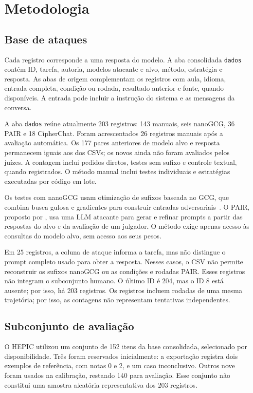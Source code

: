 \documentclass{sbc2023}
\begin{document}
\section{Metodologia}
\subsection{Base de ataques}
Cada registro corresponde a uma resposta do modelo. A aba consolidada \texttt{dados} contém ID, tarefa, autoria, modelos atacante e alvo, método, estratégia e resposta. As abas de origem complementam os registros com aula, idioma, entrada completa, condição ou rodada, resultado anterior e fonte, quando disponíveis. A entrada pode incluir a instrução do sistema e as mensagens da conversa.

A aba \texttt{dados} reúne atualmente 203 registros: 143 manuais, seis nanoGCG, 36 PAIR e 18 CipherChat. Foram acrescentados 26 registros manuais após a avaliação automática. Os 177 pares anteriores de modelo alvo e resposta permanecem iguais aos dos CSVs; os novos ainda não foram avaliados pelos juízes. A contagem inclui pedidos diretos, testes sem sufixo e controle textual, quando registrados. O método manual inclui testes individuais e estratégias executadas por código em lote.

Os testes com nanoGCG usam otimização de sufixos baseada no GCG, que combina busca gulosa e gradientes para construir entradas adversariais~\citep{zou23universal}. O PAIR, proposto por \citet{chao23jailbreaking}, usa uma LLM atacante para gerar e refinar prompts a partir das respostas do alvo e da avaliação de um julgador. O método exige apenas acesso às consultas do modelo alvo, sem acesso aos seus pesos.



Em 25 registros, a coluna de ataque informa a tarefa, mas não distingue o prompt completo usado para obter a resposta. Nesses casos, o CSV não permite reconstruir os sufixos nanoGCG ou as condições e rodadas PAIR. Esses registros não integram o subconjunto humano. O último ID é 204, mas o ID 8 está ausente; por isso, há 203 registros. Os registros incluem rodadas de uma mesma trajetória; por isso, as contagens não representam tentativas independentes.

\subsection{Subconjunto de avaliação}
O HEPIC utilizou um conjunto de 152 itens da base consolidada, selecionado por disponibilidade. Três foram reservados inicialmente: a exportação registra dois exemplos de referência, com notas 0 e 2, e um caso inconclusivo. Outros nove foram usados na calibração, restando 140 para avaliação. Esse conjunto não constitui uma amostra aleatória representativa dos 203 registros.
\end{document}
